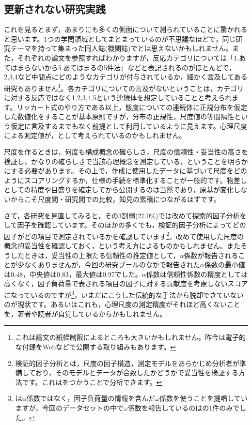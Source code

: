 \documentclass{ltjsbook}
\begin{document}
\subsection{更新されない研究実践}
これを見るとまず，あまりにも多くの側面について測られていることに驚かれると思います。1つの学問領域としてまとまっているのが不思議なほどで，同じ研究テーマを持って集まった同人誌(機関誌)でとは思えないかもしれません。また，それぞれの論文を参照すればわかりますが，反応カテゴリについては「1.あてはまらないから5.あてはまるの5件法」などと表記されるのがほとんどで，2,3,4など中間点にどのようなカテゴリが付与されているか，細かく言及してある研究もありません\footnote{これは論文の紙幅制限によるところも大きいかもしれません。昨今は電子的な付録をWebなどで公開する取り組みもあります。}。各カテゴリについての言及がないということは，カテゴリに対する反応ではなく1,2,3,4,5という連続体を想定していることと考えられます。リッカート式のやり方である以上，態度についての連続体に正規分布を仮定した数値化をすることが基本原則ですが，分布の正規性，尺度値の等間隔性という仮定に言及するまでもなく前提として利用しているように見えます。心理尺度による測定値が，として考えられているのかもしれません。

尺度を作るときは，何度も構成概念の確らしさ，尺度の信頼性・妥当性の高さを検証し，かなりの確らしさで当該心理概念を測定している，ということを明らかにする必要があります。その上で，作成に使用したデータに基づいて尺度をどのようにスコアリングするか，仕様の手続を標準化することが一般的です。物差しとしての精度や目盛りを確定してから公開するのは当然であり，原基が変化しないからこそ尺度間・研究間での比較，知見の累積につながるはずです。

さて，各研究を見直してみると，その3割弱(27.0\%)では改めて探索的因子分析をして因子を確認しています。そのほかの多くでも，検証的因子分析によってどの因子がどの項目で測定されているかを確認しています\footnote{検証的因子分析とは，尺度の因子構造，測定モデルをあらかじめ分析者が準備しており，そのモデルとデータが合致したかどうかで妥当性を検証する方法です。これはをつかうことで分析できます。}。改めて使用した尺度の概念的妥当性を確認しておく，という考え方によるものかもしれません。またそうしたときは，妥当性の上限たる信頼性の推定値として，$\alpha$係数が報告されることが少なくありませんが，今回の研究プールのなかで報告された$\alpha$係数の最小値は0.48，中央値は0.83，最大値は0.97でした。$\alpha$係数は信頼性係数の精度としては高くなく，因子負荷量で表される項目の因子に対する貢献度を考慮しないスコアになっているのですが\footnote{\citet{ShimizuKazuaki2007}は$\alpha$係数ではなく，因子負荷量の情報を含んだ$\omega$係数を使うことを提唱していますが，今回のデータセットの中で$\omega$係数を報告しているのは\citet{Nagai202192}の1件のみでした。}，いまだにこうした伝統的な手法から脱却できていないのが現状です。あるいはこれも，心理尺度の測定精度がそれほど高くないことを，著者や読者が自覚しているからかもしれません。
\end{document}
